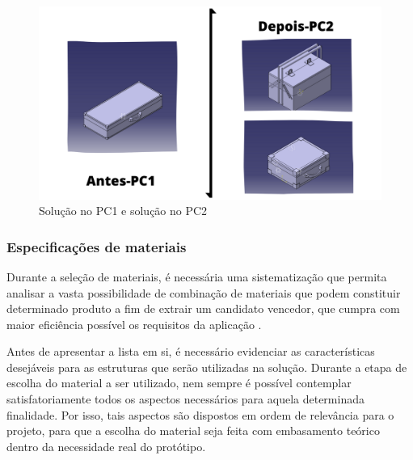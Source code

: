 \begin{figure}[!h]
	\centering
	\label{bateria_maleta}
		\includegraphics[width=1\textwidth]{figuras/antes_depois.png}
	\caption{Solução no PC1 e solução no PC2}
	\label{antes_depois}
	\end{figure}

\subsubsection{Especificações de materiais}
\label{sub:Especificações de materiais}

\par Durante a seleção de materiais, é necessária uma sistematização que permita analisar a vasta possibilidade de combinação de materiais que podem constituir determinado produto a fim de extrair um candidato vencedor, que cumpra com maior eficiência possível os requisitos da aplicação \cite{walterconteudo}.

\par Antes de apresentar a lista em si, é necessário evidenciar as características desejáveis para as estruturas que serão utilizadas na solução. Durante a etapa de escolha do material a ser utilizado, nem sempre é possível contemplar satisfatoriamente todos os aspectos necessários para aquela determinada finalidade. Por isso, tais aspectos são dispostos em ordem de relevância para o projeto, para que a escolha do material seja feita com embasamento teórico dentro da necessidade real do protótipo. 


